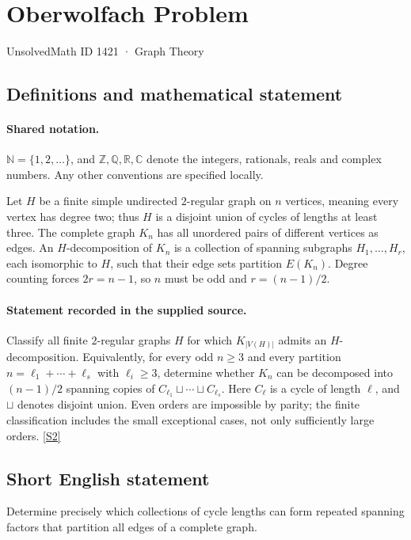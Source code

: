 \documentclass[11pt]{article}
\newcommand{\sref}[2]{\hyperlink{source:#1:#2}{[S#2]}}
\begin{document}
\setcounter{section}{1420}
\section{Oberwolfach Problem}\label{1421}
{\small\sffamily UnsolvedMath ID 1421 · Graph Theory}
\subsection{Definitions and mathematical statement}

\paragraph{Shared notation.}$\mathbb N=\{1,2,\ldots\}$, and $\mathbb Z,\mathbb Q,\mathbb R,\mathbb C$ denote the integers, rationals, reals and complex numbers. Any other conventions are specified locally.


Let $H$ be a finite simple undirected $2$-regular graph on $n$ vertices, meaning every vertex has degree two; thus $H$ is a disjoint union of cycles of lengths at least three. The complete graph $K_n$ has all unordered pairs of different vertices as edges. An $H$-decomposition of $K_n$ is a collection of spanning subgraphs $H_1,\ldots,H_r$, each isomorphic to $H$, such that their edge sets partition $E(K_n)$. Degree counting forces $2r=n-1$, so $n$ must be odd and $r=(n-1)/2$.
\paragraph{Statement recorded in the supplied source.}
Classify all finite $2$-regular graphs $H$ for which $K_{|V(H)|}$ admits an $H$-decomposition. Equivalently, for every odd $n\ge3$ and every partition $n=\ell_1+\cdots+\ell_s$ with $\ell_i\ge3$, determine whether $K_n$ can be decomposed into $(n-1)/2$ spanning copies of $C_{\ell_1}\sqcup\cdots\sqcup C_{\ell_s}$. Here $C_\ell$ is a cycle of length $\ell$, and $\sqcup$ denotes disjoint union. Even orders are impossible by parity; the finite classification includes the small exceptional cases, not only sufficiently large orders. \sref{1421}{2}
\subsection{Short English statement}
Determine precisely which collections of cycle lengths can form repeated spanning factors that partition all edges of a complete graph.
\end{document}
